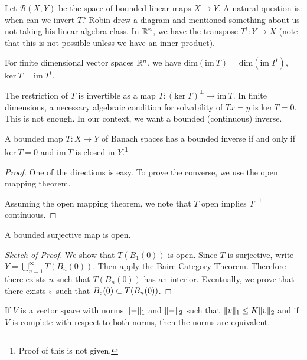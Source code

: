 \documentclass[10pt, twoside]{article}
\begin{document}
    Let $\mathcal{B}(X,Y)$ be the space of bounded linear maps $X \to Y$. A
    natural question is: when can we invert $T$? Robin drew a diagram and
    mentioned something about us not taking his linear algebra class. In
    $\mathbb{R}^n$, we have the transpose $T^t: Y \to X$ (note that this is not
    possible unless we have an inner product).

    \begin{thm} For finite dimensional vector spaces $\mathbb{R}^n$, we
    have $\mathrm{dim}(\mathrm{im}\ T) = \mathrm{dim}(\mathrm{im}\ T^t)$,
$\mathrm{ker}\ T \perp \mathrm{im}\ T^t$.  \end{thm}

    The restriction of $T$ is invertible as a map $T: (\mathrm{ker}\ T)^{\perp}
    \to \mathrm{im}\ T$. In finite dimensions, a necessary algebraic condition
    for solvability of $Tx = y$ is $\mathrm{ker}\ T = 0$. This is not enough.
    In our context, we want a bounded (continuous) inverse.

    \begin{thm} A bounded map $T: X \to Y$ of Banach spaces has a bounded
        inverse if and only if $\mathrm{ker}\ T = 0$ and $\mathrm{im}\ T$ is
        closed in $Y$.\footnote{Proof of this is not given.} \begin{proof} One
            of the directions is easy. To prove the converse, we use the open
            mapping theorem.

            Assuming the open mapping theorem, we note that $T$ open implies
        $T^{-1}$ continuous.  \end{proof} \end{thm}


    \begin{thm} A bounded surjective map is open.
        \begin{proof}[Sketch of Proof] We show that $T(B_1(0))$ is open. Since
            $T$ is surjective, write $Y = \bigcup_{n=1}^{\infty} T(B_n(0))$.
            Then apply the Baire Category Theorem. Therefore there exists $n$
            such that $\overline{T(B_n(0))}$ has an interior. Eventually, we
            prove that there exists $\varepsilon$ such that $B_{\varepsilon}(0) \subset
            T(B_n(0))$.  \end{proof} \end{thm}
    
    \begin{cor} If $V$ is a vector space with norms $\lVert-\rVert_1$ and
    $\lVert-\rVert_2$ such that $\lVert v\rVert_1 \leq K \lVert v\rVert_2$ and if $V$ is
complete with respect to both norms, then the norms are equivalent.  \end{cor}
\end{document}
